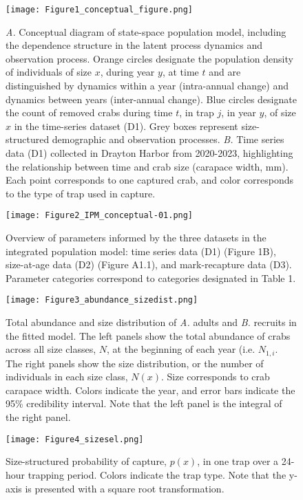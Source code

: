 \documentclass{article}
\begin{document}
\begin{figure}[H]
    \centering
    \texttt{[image: Figure1\_conceptual\_figure.png]}
    \caption{\textit{A.} Conceptual diagram of state-space population model, including the dependence structure in the latent process dynamics and observation process. Orange circles designate the population density of individuals of size $x$, during year $y$, at time $t$ and are distinguished by dynamics within a year (intra-annual change) and dynamics between years (inter-annual change). Blue circles designate the count of removed crabs during time $t$, in trap $j$, in year $y$, of size $x$ in the time-series dataset (D1). Grey boxes represent size-structured demographic and observation processes. \textit{B.} Time series data (D1) collected in Drayton Harbor from 2020-2023, highlighting the relationship between time and crab size (carapace width, mm). Each point corresponds to one captured crab, and color corresponds to the type of trap used in capture.}
\end{figure}

\begin{figure}[H]
    \centering
    \texttt{[image: Figure2\_IPM\_conceptual-01.png]}
    \caption{Overview of parameters informed by the three datasets in the integrated population model: time series data (D1) (Figure 1B), size-at-age data (D2) (Figure A1.1), and mark-recapture data (D3). Parameter categories correspond to categories designated in Table 1.}
\end{figure}

\begin{figure}[H]
    \centering
    \texttt{[image: Figure3\_abundance\_sizedist.png]}
    \caption{Total abundance and size distribution of \textit{A.} adults and \textit{B.} recruits in the fitted model. The left panels show the total abundance of crabs across all size classes, $N$, at the beginning of each year (i.e. $N_{1, i}$. The right panels show the size distribution, or the number of individuals in each size class, $N(x)$. Size corresponds to crab carapace width. Colors indicate the year, and error bars indicate the 95\% credibility interval. Note that the left panel is the integral of the right panel.}
\end{figure}

\begin{figure}[H]
    \centering
    \texttt{[image: Figure4\_sizesel.png]}
    \caption{Size-structured probability of capture, $p(x)$, in one trap over a 24-hour trapping period. Colors indicate the trap type. Note that the y-axis is presented with a square root transformation.}
\end{figure}
\end{document}
